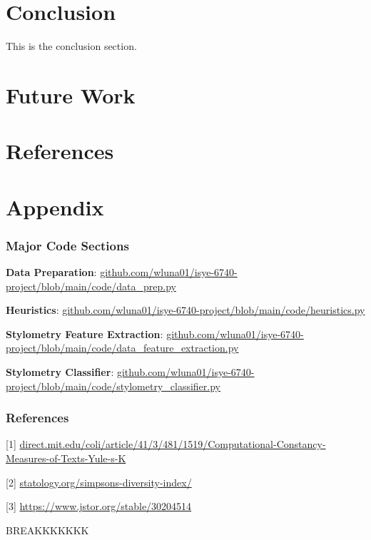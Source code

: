 \documentclass{article}
\begin{document}
\begin{titlepage}
\section{Conclusion}
This is the conclusion section.

\section{Future Work}

\section{References}

\section{Appendix}
\subsubsection{Major Code Sections}
\textbf{Data Preparation}: \url{github.com/wluna01/isye-6740-project/blob/main/code/data_prep.py}

\textbf{Heuristics}: \url{github.com/wluna01/isye-6740-project/blob/main/code/heuristics.py}

\textbf{Stylometry Feature Extraction}: \url{github.com/wluna01/isye-6740-project/blob/main/code/data_feature_extraction.py}

\textbf{Stylometry Classifier}: \url{github.com/wluna01/isye-6740-project/blob/main/code/stylometry_classifier.py}

\subsubsection{References}
[1] \url{direct.mit.edu/coli/article/41/3/481/1519/Computational-Constancy-Measures-of-Texts-Yule-s-K}

[2] \url{statology.org/simpsons-diversity-index/}

[3] \url{https://www.jstor.org/stable/30204514}

BREAKKKKKKK





\end{titlepage}
\end{document}

